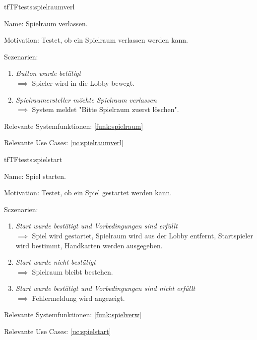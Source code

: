 \begin{description}[leftmargin=5em, style=sameline]
\begin{lhp}{tf}{TF}{tests:spielraumverl}
	\item [Name:] Spielraum verlassen.
	\item [Motivation:] Testet, ob ein Spielraum verlassen werden kann.
	\item [Sczenarien:] \hfill
	\begin{enumerate}
		\item \textit{Button wurde betätigt} \\ $\implies$ Spieler wird in die Lobby bewegt.
		\item \textit{Spielraumersteller möchte Spielraum verlassen} \\ $\implies$ System meldet "{}Bitte Spielraum zuerst löschen"{}.
	\end{enumerate}
	\item [Relevante Systemfunktionen:] \ref{funk:spielraum}
	\item [Relevante Use Cases:] \ref{uc:spielraumverl}
\end{lhp}

\begin{lhp}{tf}{TF}{tests:spielstart}
	\item [Name:] Spiel starten.
	\item [Motivation:] Testet, ob ein Spiel gestartet werden kann.
	\item [Sczenarien:] \hfill
	\begin{enumerate}
		\item \textit{Start wurde bestätigt und Vorbedingungen sind erfüllt} \\ $\implies$ Spiel wird gestartet, Spielraum wird aus der Lobby entfernt, Startspieler wird bestimmt, Handkarten werden ausgegeben.
		\item \textit{Start wurde nicht bestätigt} \\ $\implies$ Spielraum bleibt bestehen.
		\item \textit{Start wurde bestätigt und Vorbedingungen sind nicht erfüllt} \\ $\implies$ Fehlermeldung wird angezeigt.
	\end{enumerate}
	\item [Relevante Systemfunktionen:] \ref{funk:spielverw}
	\item [Relevante Use Cases:] \ref{uc:spielstart}
\end{lhp}


\end{description}
